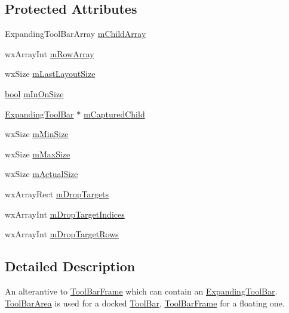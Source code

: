 \subsection*{Protected Attributes}
\begin{DoxyCompactItemize}
\item 
Expanding\+Tool\+Bar\+Array \hyperlink{class_tool_bar_area_aa0175290668c74cf3464a3d5465f21d5}{m\+Child\+Array}
\item 
wx\+Array\+Int \hyperlink{class_tool_bar_area_ab89bf273c38f4566b0570742049be5f0}{m\+Row\+Array}
\item 
wx\+Size \hyperlink{class_tool_bar_area_a0103098d46d91ec590a843710bf04d8b}{m\+Last\+Layout\+Size}
\item 
\hyperlink{mac_2config_2i386_2lib-src_2libsoxr_2soxr-config_8h_abb452686968e48b67397da5f97445f5b}{bool} \hyperlink{class_tool_bar_area_a675d75e03b7352aca197d4783ba67eef}{m\+In\+On\+Size}
\item 
\hyperlink{class_expanding_tool_bar}{Expanding\+Tool\+Bar} $\ast$ \hyperlink{class_tool_bar_area_a09209913e3356d52837a323cbfbec819}{m\+Captured\+Child}
\item 
wx\+Size \hyperlink{class_tool_bar_area_a7284a019ace30ed7a1b98e1be94d251f}{m\+Min\+Size}
\item 
wx\+Size \hyperlink{class_tool_bar_area_aca2d686db186f0698a62431edeaf9e16}{m\+Max\+Size}
\item 
wx\+Size \hyperlink{class_tool_bar_area_a8244df999781eafc60b585ebfaba509d}{m\+Actual\+Size}
\item 
wx\+Array\+Rect \hyperlink{class_tool_bar_area_ad836e795119d4038bb80dbb869196b0e}{m\+Drop\+Targets}
\item 
wx\+Array\+Int \hyperlink{class_tool_bar_area_a88d97f65879f88d94c5360ccfd163147}{m\+Drop\+Target\+Indices}
\item 
wx\+Array\+Int \hyperlink{class_tool_bar_area_a2825cb370b5bb5acb9d69f4f899ce4f8}{m\+Drop\+Target\+Rows}
\end{DoxyCompactItemize}


\subsection{Detailed Description}
An alterantive to \hyperlink{class_tool_bar_frame}{Tool\+Bar\+Frame} which can contain an \hyperlink{class_expanding_tool_bar}{Expanding\+Tool\+Bar}. \hyperlink{class_tool_bar_area}{Tool\+Bar\+Area} is used for a \textquotesingle{}docked\textquotesingle{} \hyperlink{class_tool_bar}{Tool\+Bar}, \hyperlink{class_tool_bar_frame}{Tool\+Bar\+Frame} for a floating one. 

